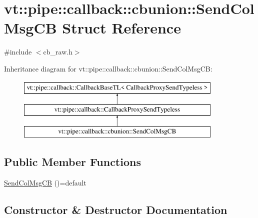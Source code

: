\hypertarget{structvt_1_1pipe_1_1callback_1_1cbunion_1_1_send_col_msg_c_b}{}\section{vt\+:\+:pipe\+:\+:callback\+:\+:cbunion\+:\+:Send\+Col\+Msg\+CB Struct Reference}
\label{structvt_1_1pipe_1_1callback_1_1cbunion_1_1_send_col_msg_c_b}


{\ttfamily \#include $<$cb\+\_\+raw.\+h$>$}

Inheritance diagram for vt\+:\+:pipe\+:\+:callback\+:\+:cbunion\+:\+:Send\+Col\+Msg\+CB\+:\begin{figure}[H]
\begin{center}
\leavevmode
\includegraphics[height=3.000000cm]{structvt_1_1pipe_1_1callback_1_1cbunion_1_1_send_col_msg_c_b}
\end{center}
\end{figure}
\subsection*{Public Member Functions}
\begin{DoxyCompactItemize}
\item 
\hyperlink{structvt_1_1pipe_1_1callback_1_1cbunion_1_1_send_col_msg_c_b_a1827c743e3fd48298b79b915c8132c8f}{Send\+Col\+Msg\+CB} ()=default
\end{DoxyCompactItemize}


\subsection{Constructor \& Destructor Documentation}
\mbox{\label{structvt_1_1pipe_1_1callback_1_1cbunion_1_1_send_col_msg_c_b_a1827c743e3fd48298b79b915c8132c8f}} 
